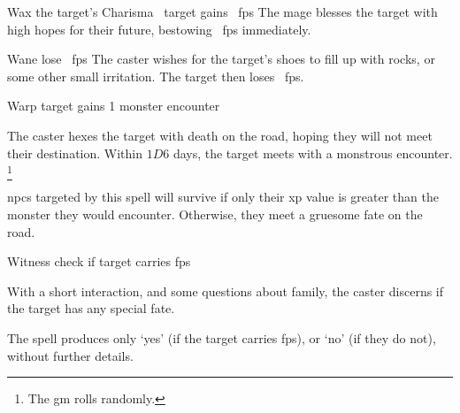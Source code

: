   {\mFate}%
  {Wax}%
  {}%
  {the target's Charisma}%
  {\spellArea~target gains \rollConv~\glspl{fp}}%
  {
    The mage blesses the target with high hopes for their future, bestowing \rollConv~\glspl{fp} immediately.
  }

  {\mFate}%
  {Wane}%
  {}%
  {}%
  {lose \rollConv~\glspl{fp}}%
  {
    The caster wishes for the target's shoes to fill up with rocks, or some other small irritation.
    The target then loses \rollConv~\glspl{fp}.
  }


  {\mFate}%
  {Warp}%
  {}%
  {}%
  {target gains 1 monster encounter}%
  {
    The caster hexes the target with death on the road, hoping they will not meet their destination.
    Within $1D6$ days, the target meets with a monstrous encounter.%
    \footnote{The \gls{gm} rolls randomly.}

    \Glspl{npc} targeted by this spell will survive if only their \gls{xp} value is greater than the monster they would encounter.
    Otherwise, they meet a gruesome fate on the road.
  }

  {\mFate}%
  {Witness}%
  {}%
  {}%
  {check if target carries \glspl{fp}}%
  {
    With a short interaction, and some questions about family, the caster discerns if the target has any special fate.

    The spell produces only `yes' (if the target carries \glspl{fp}), or `no' (if they do not), without further details.
  }

